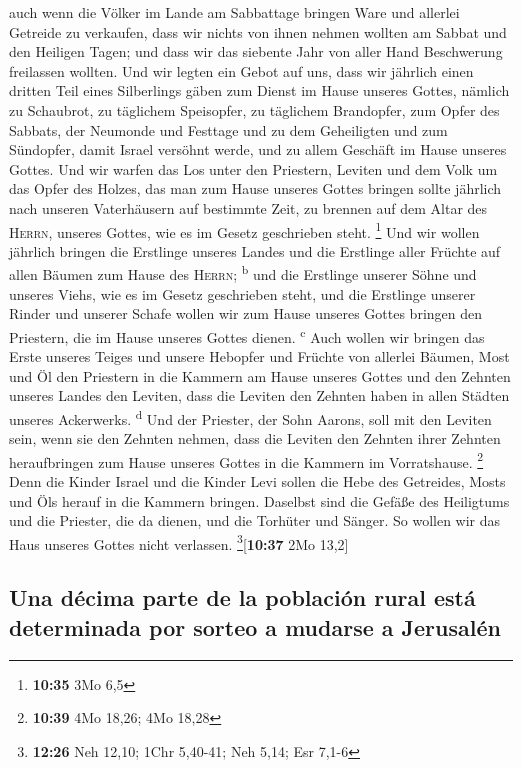  auch wenn die Völker im Lande am Sabbattage bringen Ware
und allerlei Getreide zu verkaufen, dass wir nichts von ihnen nehmen
wollten am Sabbat und den Heiligen Tagen; und dass wir das siebente Jahr
von aller Hand Beschwerung freilassen wollten.  Und wir
legten ein Gebot auf uns, dass wir jährlich einen dritten Teil eines
Silberlings gäben zum Dienst im Hause unseres Gottes, 
nämlich zu Schaubrot, zu täglichem Speisopfer, zu täglichem Brandopfer,
zum Opfer des Sabbats, der Neumonde und Festtage und zu dem Geheiligten
und zum Sündopfer, damit Israel versöhnt werde, und zu allem Geschäft im
Hause unseres Gottes.  Und wir warfen das Los unter den
Priestern, Leviten und dem Volk um das Opfer des Holzes, das man zum
Hause unseres Gottes bringen sollte jährlich nach unseren Vaterhäusern
auf bestimmte Zeit, zu brennen auf dem Altar des \textsc{Herrn}, unseres
Gottes, wie es im Gesetz geschrieben steht. \footnote{\textbf{10:35} 3Mo
  6,5}  Und wir wollen jährlich bringen die Erstlinge
unseres Landes und die Erstlinge aller Früchte auf allen Bäumen zum
Hause des \textsc{Herrn}; \textsuperscript{b}  und die
Erstlinge unserer Söhne und unseres Viehs, wie es im Gesetz geschrieben
steht, und die Erstlinge unserer Rinder und unserer Schafe wollen wir
zum Hause unseres Gottes bringen den Priestern, die im Hause unseres
Gottes dienen. \textsuperscript{c}  Auch wollen wir
bringen das Erste unseres Teiges und unsere Hebopfer und Früchte von
allerlei Bäumen, Most und Öl den Priestern in die Kammern am Hause
unseres Gottes und den Zehnten unseres Landes den Leviten, dass die
Leviten den Zehnten haben in allen Städten unseres Ackerwerks.
\textsuperscript{d}  Und der Priester, der Sohn Aarons,
soll mit den Leviten sein, wenn sie den Zehnten nehmen, dass die Leviten
den Zehnten ihrer Zehnten heraufbringen zum Hause unseres Gottes in die
Kammern im Vorratshause. \footnote{\textbf{10:39} 4Mo 18,26; 4Mo 18,28}
 Denn die Kinder Israel und die Kinder Levi sollen die
Hebe des Getreides, Mosts und Öls herauf in die Kammern bringen.
Daselbst sind die Gefäße des Heiligtums und die Priester, die da dienen,
und die Torhüter und Sänger. So wollen wir das Haus unseres Gottes nicht
verlassen. \footnote{\textbf{12:26} Neh 12,10; 1Chr 5,40-41; Neh 5,14;
  Esr 7,1-6}{[}\textbf{10:37} 2Mo 13,2{]}

\hypertarget{una-duxe9cima-parte-de-la-poblaciuxf3n-rural-estuxe1-determinada-por-sorteo-a-mudarse-a-jerusaluxe9n}{%
\subsection{Una décima parte de la población rural está determinada por
sorteo a mudarse a
Jerusalén}\label{una-duxe9cima-parte-de-la-poblaciuxf3n-rural-estuxe1-determinada-por-sorteo-a-mudarse-a-jerusaluxe9n}}

